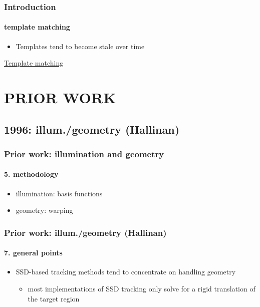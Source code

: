 \begin{frame}
\frametitle{Introduction}
\framesubtitle{template matching}
\logoCSIPCPL\mypagenum
	\begin{itemize}
		\item Templates tend to become stale over time
	\end{itemize}
	\href{run:distribute/run_TRK_templateMatching.bat}{{\color{blue}\underline {Template matching}}}
\end{frame}

\section{PRIOR WORK}
\subsection{1996: illum./geometry (Hallinan)}
\begin{frame}
\frametitle{Prior work: illumination and geometry}
\framesubtitle{5. methodology}
\logoCSIPCPL\mypagenum
{}
	\begin{itemize}
		\item illumination: basis functions
		\item geometry: warping
	\end{itemize}
\end{frame}



\begin{frame}
\frametitle{Prior work: illum./geometry (Hallinan)}
\framesubtitle{7. general points}
\logoCSIPCPL\mypagenum
{}
	\begin{itemize}
		\item SSD-based tracking methods tend to concentrate on handling geometry 
			\begin{itemize}
				\item most implementations of SSD tracking only solve for a rigid translation of the target region
			\end{itemize}
	\end{itemize}
\end{frame}




